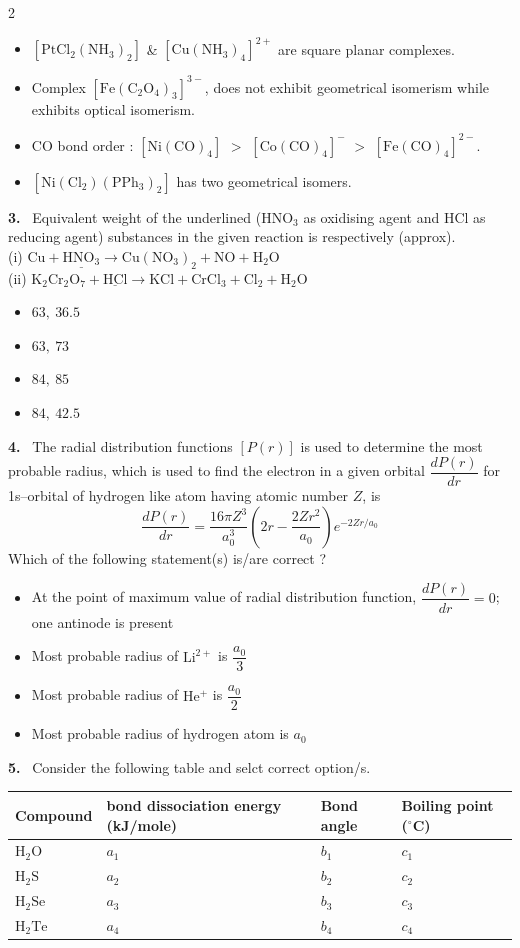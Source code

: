 \documentclass[10pt]{extarticle}
\newcommand{\qn}[1]{\par\smallskip\noindent\textbf{#1.}~}
\newenvironment{qoptions}{\begin{itemize}[leftmargin=1.8em,itemsep=1pt,topsep=2pt,label={}]}{\end{itemize}}
\newcommand{\opt}[2]{\item[(#1)] #2}
\begin{document}
\begin{multicols}{2}
\begin{qoptions}
\opt{A}{$\mathrm{[PtCl_2(NH_3)_2]}$ \& $\mathrm{[Cu(NH_3)_4]^{2+}}$ are square planar complexes.}
\opt{B}{Complex $\mathrm{[Fe(C_2O_4)_3]^{3-}}$, does not exhibit geometrical isomerism while exhibits optical isomerism.}
\opt{C}{CO bond order : $\mathrm{[Ni(CO)_4]}$ $>$ $\mathrm{[Co(CO)_4]^-}$ $>$ $\mathrm{[Fe(CO)_4]^{2-}}$.}
\opt{D}{$\mathrm{[Ni(Cl_2)(PPh_3)_2]}$ has two geometrical isomers.}
\end{qoptions}
\qn{3} Equivalent weight of the underlined ($\mathrm{HNO_3}$ as oxidising agent and HCl as reducing agent) substances in the given reaction is respectively (approx).\\
(i) $\mathrm{Cu+\underline{HNO_3}\longrightarrow Cu(NO_3)_2+NO+H_2O}$\\
(ii) $\mathrm{K_2Cr_2O_7+\underline{HCl}\longrightarrow KCl+CrCl_3+Cl_2+H_2O}$
\begin{qoptions}
\opt{A}{$63,\ 36.5$}
\opt{B}{$63,\ 73$}
\opt{C}{$84,\ 85$}
\opt{D}{$84,\ 42.5$}
\end{qoptions}
\qn{4} The radial distribution functions $[P(r)]$ is used to determine the most probable radius, which is used to find the electron in a given orbital $\dfrac{dP(r)}{dr}$ for 1s--orbital of hydrogen like atom having atomic number $Z$, is
\[\dfrac{dP(r)}{dr}=\dfrac{16\pi Z^3}{a_0^3}\left(2r-\dfrac{2Zr^2}{a_0}\right)e^{-2Zr/a_0}\]
Which of the following statement(s) is/are correct ?
\begin{qoptions}
\opt{A}{At the point of maximum value of radial distribution function, $\dfrac{dP(r)}{dr}=0$; one antinode is present}
\opt{B}{Most probable radius of $\mathrm{Li^{2+}}$ is $\dfrac{a_0}{3}$}
\opt{C}{Most probable radius of $\mathrm{He^{+}}$ is $\dfrac{a_0}{2}$}
\opt{D}{Most probable radius of hydrogen atom is $a_0$}
\end{qoptions}
\qn{5} Consider the following table and selct correct option/s.
\begin{center}
{\footnotesize\setlength\tabcolsep{3pt}\begin{tabular}{@{}p{.2\linewidth}p{.3\linewidth}p{.17\linewidth}p{.22\linewidth}@{}}
\toprule
Compound & bond dissociation energy (kJ/mole) & Bond angle & Boiling point ($^\circ$C)\\
\midrule
$\mathrm{H_2O}$ & $a_1$ & $b_1$ & $c_1$\\
$\mathrm{H_2S}$ & $a_2$ & $b_2$ & $c_2$\\
$\mathrm{H_2Se}$ & $a_3$ & $b_3$ & $c_3$\\
$\mathrm{H_2Te}$ & $a_4$ & $b_4$ & $c_4$\\

\end{tabular}}
\end{center}
\end{multicols}
\end{document}
